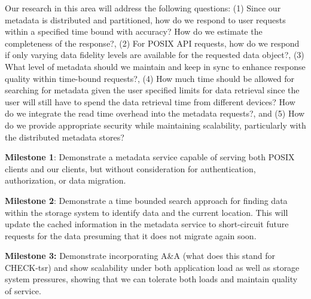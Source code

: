 Our research in this area will address the following questions:
(1) Since our metadata is distributed and partitioned, how do we respond to user
  requests within a specified time bound with accuracy? How do we estimate the
  completeness of the response?, 
(2) For POSIX API requests, how do we respond if only varying data fidelity
  levels are available for the requested data object?, 
(3) What level of metadata should we maintain and keep in sync to enhance
  response quality within time-bound requests?, 
(4) How much time should be allowed for searching for metadata given the user
  specified limits for data retrieval since the user will still have to spend
  the data retrieval time from different devices? How do we integrate the read
  time overhead into the metadata requests?, and
(5) How do we provide appropriate security while maintaining scalability,
  particularly with the distributed metadata stores?

\begin{tightEnumerate}

\item {\bf Milestone 1}: Demonstrate a metadata service capable of serving both POSIX
clients and our clients, but without consideration for authentication,
authorization, or data migration.

\item {\bf Milestone 2}: Demonstrate a time bounded search approach for finding data
within the storage system to identify data and the current location.  This will
update the cached information in the metadata service to short-circuit future
requests for the data presuming that it does not migrate again soon.

\item {\bf Milestone 3:} Demonstrate incorporating {\color{red}A\&A (what does this stand for CHECK-tsr)} and show scalability under
both application load as well as storage system pressures, showing that we can
tolerate both loads and maintain quality of service.

\end{tightEnumerate}


